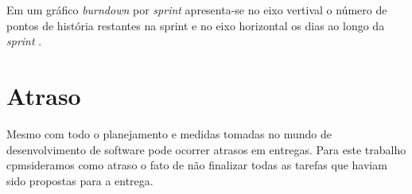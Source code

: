     Em um gráfico \textit{burndown} por \textit{sprint} apresenta-se no eixo vertival o número de pontos de história restantes na sprint e no eixo horizontal os dias ao longo da \textit{sprint} \cite{cohn06}.

  \section{Atraso}

    Mesmo com todo o planejamento e medidas tomadas no mundo de desenvolvimento de software pode ocorrer atrasos em entregas. Para este trabalho cpmsideramos como atraso o fato de não finalizar todas as tarefas que haviam sido propostas para a entrega.





